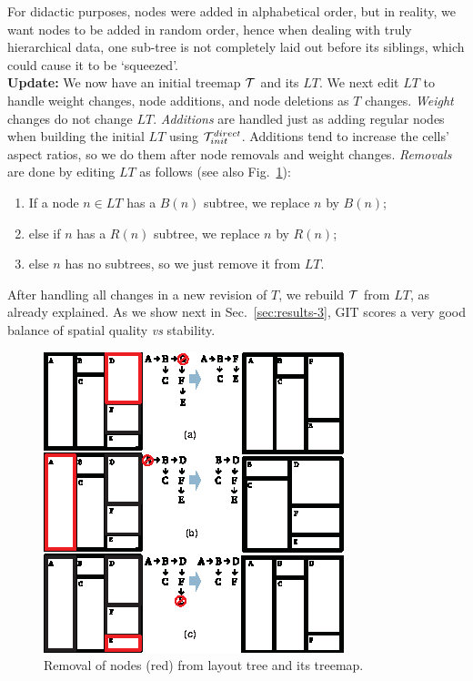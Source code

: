For didactic purposes, nodes were added in alphabetical order, but in reality, we want nodes to be added in random order, hence when dealing with truly hierarchical data, one sub-tree is not completely laid out before its siblings, which could cause it to be `squeezed'.\\

\noindent\textbf{Update:} We now have an initial treemap ${\cal T}$ and its $LT$. We next edit $LT$ to handle weight changes, node additions, and node deletions as $T$ changes. \emph{Weight} changes do not change $LT$. \emph{Additions} are handled just as adding regular nodes when building the initial $LT$ using ${\cal T}_{init}^{direct}$. Additions tend to increase the cells' aspect ratios, so we do them after node removals and weight changes. \emph{Removals} are done by editing $LT$ as follows (see also Fig.~\ref{fig:git_removal}):

\begin{enumerate}
\item If a node $n\in LT$ has a $B(n)$ subtree, we replace $n$ by $B(n)$;
\item else if $n$ has a $R(n)$ subtree, we replace $n$ by $R(n)$;
\item else $n$ has no subtrees, so we just remove it from $LT$.
\end{enumerate}

After handling all changes in a new revision of $T$, we rebuild ${\cal T}$ from $LT$, as already explained. As we show next in Sec.~\ref{sec:results-3}, GIT scores a very good balance of spatial quality \emph{vs} stability.

\begin{figure}[htbp!]
\centering
\includegraphics[width=.9\textwidth]{figures/treemap-algorithm/git_removal.eps}
\caption{Removal of nodes (red) from layout tree and its treemap.}
\label{fig:git_removal}
\end{figure}


